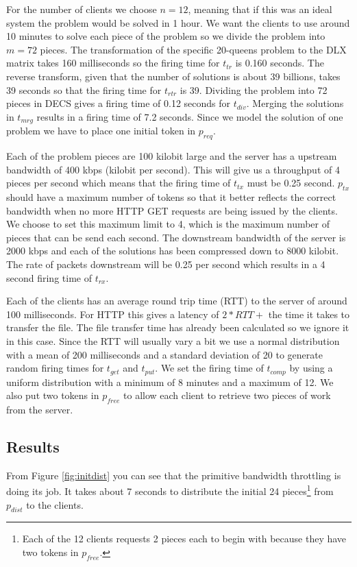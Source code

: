 For the number of clients we choose $n = 12$, meaning that if this was an ideal system the problem would be solved in 1 hour.
We want the clients to use around 10 minutes to solve each piece of the problem so we divide the problem into $m = 72$ pieces.
The transformation of the specific 20-queens problem to the DLX matrix takes 160 milliseconds so the firing time for $t_{tr}$ is 0.160 seconds.
The reverse transform, given that the number of solutions is about 39 billions, takes 39 seconds so that the firing time for $t_{rtr}$ is 39.
Dividing the problem into 72 pieces in DECS gives a firing time of 0.12 seconds for $t_{div}$.
Merging the solutions in $t_{mrg}$ results in a firing time of 7.2 seconds.
Since we model the solution of one problem we have to place one initial token in $p_{req}$.

Each of the problem pieces are 100 kilobit large and the server has a upstream bandwidth of 400 kbps (kilobit per second).
This will give us a throughput of 4 pieces per second which means that the firing time of $t_{tx}$ must be 0.25 second.
$p_{tx}$ should have a maximum number of tokens so that it better reflects the correct bandwidth when no more HTTP GET requests are being issued by the clients.
We choose to set this maximum limit to 4, which is the maximum number of pieces that can be send each second.
The downstream bandwidth of the server is 2000 kbps and each of the solutions has been compressed down to 8000 kilobit.
The rate of packets downstream will be 0.25 per second which results in a 4 second firing time of $t_{rx}$.

Each of the clients has an average round trip time (RTT) to the server of around 100 milliseconds.
For HTTP this gives a latency of $2*RTT +$ the time it takes to transfer the file.
The file transfer time has already been calculated so we ignore it in this case.
Since the RTT will usually vary a bit we use a normal distribution with a mean of 200 milliseconds and a standard deviation of 20 to generate random firing times for $t_{get}$ and $t_{put}$.
We set the firing time of $t_{comp}$ by using a uniform distribution with a minimum of 8 minutes and a maximum of 12.
We also put two tokens in $p_{free}$ to allow each client to retrieve two pieces of work from the server.


\subsection{Results}

From Figure \ref{fig:initdist} you can see that the primitive bandwidth throttling is doing its job.
It takes about 7 seconds to distribute the initial 24 pieces\footnote{Each of the 12 clients requests 2 pieces each to begin with because they have two tokens in $p_{free}$.} from $p_{dist}$ to the clients.

